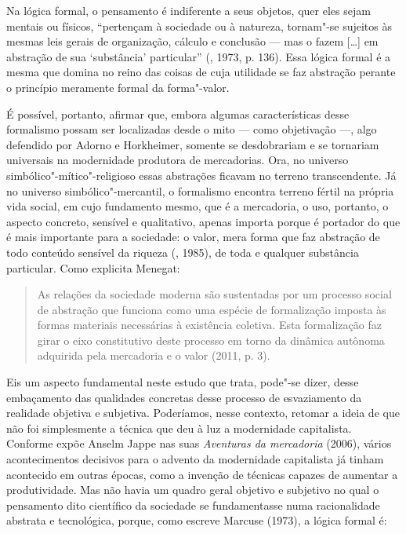 Na lógica formal, o pensamento é indiferente a seus objetos, quer eles
sejam mentais ou físicos, ``pertençam à sociedade ou à natureza,
tornam"-se sujeitos às mesmas leis gerais de organização, cálculo e
conclusão --- mas o fazem [\ldots{}] em abstração de sua `substância'
particular'' (, 1973, p. 136). Essa lógica formal
é a mesma que domina no reino das coisas de cuja
utilidade se faz abstração perante o princípio meramente formal da
forma"-valor.

É possível, portanto, afirmar que, embora algumas características desse
formalismo possam ser localizadas desde o mito --- como objetivação ---,
algo defendido por Adorno e Horkheimer, somente se desdobrariam e se
tornariam universais na modernidade produtora de mercadorias. Ora, no
universo simbólico"-mítico"-religioso essas abstrações ficavam no terreno
transcendente. Já no universo simbólico"-mercantil, o formalismo encontra
terreno fértil na própria vida social, em cujo fundamento mesmo, que é a
mercadoria, o uso, portanto, o aspecto concreto, sensível e qualitativo,
apenas importa porque é portador do que é mais importante para a
sociedade: o valor, mera forma que faz abstração de todo conteúdo
sensível da riqueza (, 1985), de toda e qualquer substância
particular. Como explicita Menegat:

\begin{quote}
As relações da sociedade moderna são sustentadas por um processo social
de abstração que funciona como uma espécie de formalização imposta às
formas materiais necessárias à existência coletiva. Esta formalização
faz girar o eixo constitutivo deste processo em torno da dinâmica
autônoma adquirida pela mercadoria e o valor (2011, p. 3).
\end{quote}

Eis um aspecto fundamental neste estudo que trata, pode"-se dizer, desse
embaçamento das qualidades concretas desse
processo de esvaziamento da realidade objetiva e subjetiva. Poderíamos,
nesse contexto, retomar a ideia de que não foi simplesmente a técnica
que deu à luz a modernidade capitalista. Conforme expõe Anselm Jappe nas
suas \emph{Aventuras da mercadoria} (2006), vários acontecimentos
decisivos para o advento da modernidade capitalista já tinham acontecido
em outras épocas, como a invenção de técnicas capazes de aumentar a
produtividade. Mas não havia um quadro geral objetivo e subjetivo no
qual o pensamento dito científico da sociedade se fundamentasse numa
racionalidade abstrata e tecnológica, porque, como escreve Marcuse (1973), a lógica formal é:

